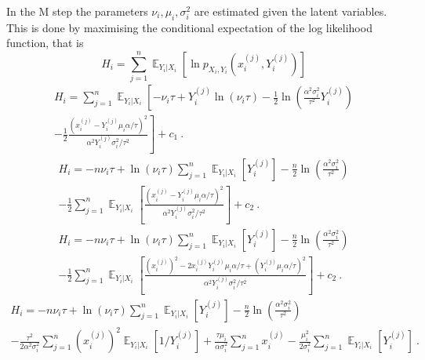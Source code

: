 \documentclass[12pt]{report}
\DeclareMathOperator{\expectation}{\mathbb{E}}
\begin{document}
In the M step the parameters $\nu_i,\mu_i,\sigma_i^2$ are estimated given the latent variables. This is done by maximising the conditional expectation of the log likelihood function, that is
\begin{equation}
H_i=\sum_{j=1}^n\expectation_{Y_i|X_i}\left[\ln p_{X_i,Y_i}\left(x_i^{(j)},Y_i^{(j)}\right)\right]
\end{equation}
\begin{multline}
H_i=\sum_{j=1}^n\expectation_{Y_i|X_i}\left[
-\nu_i\tau+Y_i^{(j)}\ln(\nu_i\tau)-\frac{1}{2}\ln\left(\frac{\alpha^2\sigma_i^2}{\tau^2}Y_i^{(j)}\right)
\right.
\\
\left.
-\frac{1}{2}\frac{\left(x_i^{(j)}-Y_i^{(j)}\mu_i\alpha/\tau\right)^2}{\alpha^2Y_i^{(j)}\sigma_i^2/\tau^2}
\right] + c_1 \ .
\end{multline}
\begin{multline}
H_i= -n\nu_i\tau+\ln(\nu_i\tau)\sum_{j=1}^n\expectation_{Y_i|X_i}\left[Y_i^{(j)}\right]-\frac{n}{2}\ln\left(\frac{\alpha^2\sigma_i^2}{\tau^2}\right)
\\
-\frac{1}{2}\sum_{j=1}^n\expectation_{Y_i|X_i}\left[\frac{\left(x_i^{(j)}-Y_i^{(j)}\mu_i\alpha/\tau\right)^2}{\alpha^2Y_i^{(j)}\sigma_i^2/\tau^2}\right]
 + c_2 \ .
\end{multline}
\begin{multline}
H_i= -n\nu_i\tau+\ln(\nu_i\tau)\sum_{j=1}^n\expectation_{Y_i|X_i}\left[Y_i^{(j)}\right]-\frac{n}{2}\ln\left(\frac{\alpha^2\sigma_i^2}{\tau^2}\right)
\\
-\frac{1}{2}\sum_{j=1}^n\expectation_{Y_i|X_i}\left[\frac{\left(x_i^{(j)}\right)^2-2x_i^{(j)}Y_i^{(j)}\mu_i\alpha/\tau+\left(Y_i^{(j)}\mu_i\alpha/\tau\right)^2}{\alpha^2Y_i^{(j)}\sigma_i^2/\tau^2}\right]
 + c_2 \ .
\end{multline}
\begin{multline}
H_i= -n\nu_i\tau+\ln(\nu_i\tau)\sum_{j=1}^n\expectation_{Y_i|X_i}\left[Y_i^{(j)}\right]-\frac{n}{2}\ln\left(\frac{\alpha^2\sigma_i^2}{\tau^2}\right)
\\
-\frac{\tau^2}{2\alpha^2\sigma_i^2}\sum_{j=1}^n\left(x_i^{(j)}\right)^2\expectation_{Y_i|X_i}\left[1/Y_i^{(j)}\right]
+ \frac{\tau\mu_i}{\alpha\sigma_i^2}\sum_{j=1}^nx_i^{(j)}
-\frac{\mu_i^2}{2\sigma_i^2}\sum_{j=1}^n\expectation_{Y_i|X_i}\left[Y_i^{(j)}\right]
\ .
\end{multline}
\end{document}
